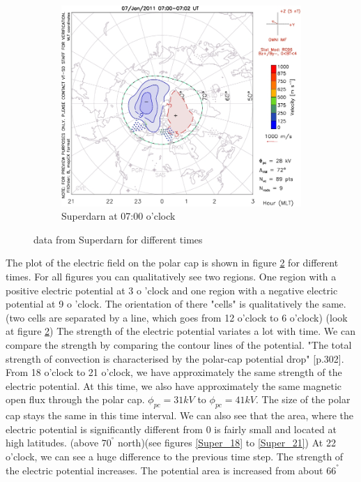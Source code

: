 \documentclass[10pt,a4paper]{article}
\begin{document}
\begin{figure}[h]
\begin{subfigure}{0.3\textwidth}
	\includegraphics[width=\textwidth]{Superdarn14.jpg}
	\caption{ Superdarn at 07:00 o'clock \label{Super_07}}
\end{subfigure}
\caption{data from Superdarn for different times}
\label{Super_overview}
\end{figure}
The plot of the electric field on the polar cap is shown in figure \ref{Super_overview} for different times. For all figures you can qualitatively see two regions. One 
region with a positive electric potential at 3 o 'clock and one region with a negative electric potential at 9 o 'clock. The orientation of there "cells" is 
qualitatively the same. (two cells are separated by a line, which goes from 12 o'clock to 6 o'clock) (look at figure \ref{Super_overview}) 
The strength of the electric potential variates a lot with time. We can compare the strength by comparing the contour lines of the potential. 
"The total strength of convection is characterised by the polar-cap potential drop" \cite{Buch2}[p.302]. From 18 o'clock to 21 o'clock, we have approximately the same 
strength of the electric potential. At this time, we also have approximately the same magnetic open flux through the polar cap. $\phi_{pc}=31kV$ to $\phi_{pc}=41 k V $. 
The size of the polar cap stays the same in this time interval. We can also see that the area, where the electric potential is significantly different from 0 is 
fairly small and located at high latitudes. (above $70^{°}$ north)(see figures \ref{Super_18} to \ref{Super_21})
At 22 o'clock, we can see a huge difference to the previous time step. The strength of the electric potential increases. The potential area is increased from about $66^{°}$
\end{document}
